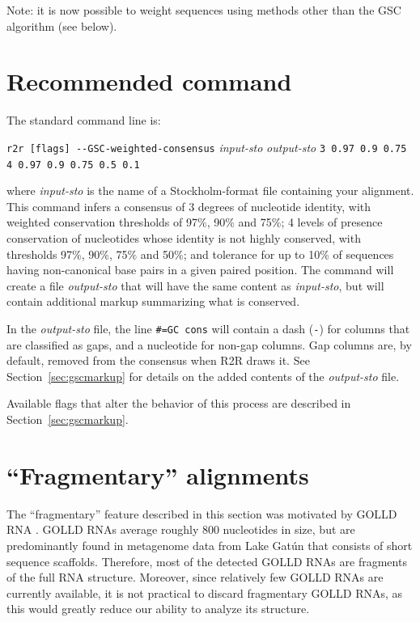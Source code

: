 \documentclass[letterpaper,12pt]{report}
\begin{document}
Note: it is now possible to weight sequences using methods other than the GSC algorithm (see below).

\section{Recommended command}
\label{sec:gscdefault}

The standard command line is:

{\tt r2r [flags] -{}-GSC-weighted-consensus} {\it input-sto} {\it output-sto} {\tt 3 0.97 0.9 0.75 4 0.97 0.9 0.75 0.5 0.1}

where {\it input-sto} is the name of a Stockholm-format file containing your alignment.
This command infers a consensus of 3 degrees of nucleotide identity, with weighted conservation thresholds
of 97\%, 90\% and 75\%; 4 levels of presence conservation of nucleotides whose identity is not highly conserved,
with thresholds 97\%, 90\%, 75\% and 50\%; and tolerance for up to 10\% of sequences having
non-canonical base pairs in a given paired position.
The command will create a file {\it output-sto} that will have the same content as {\it input-sto}, but will contain additional
markup summarizing what is conserved.

In the {\it output-sto} file, the line {\tt \#=GC cons} will contain a dash ({\tt -}) for columns that are classified as gaps, and a nucleotide for non-gap columns.
Gap columns are, by default, removed from the consensus when R2R draws it.  See Section~\ref{sec:gscmarkup} for details on the added contents of the {\it output-sto} file.

Available flags that alter the behavior of this process are described in Section~\ref{sec:gscmarkup}.

\section{``Fragmentary'' alignments}

The ``fragmentary'' feature described in this section was motivated by GOLLD RNA \cite{CoolRNAs}.
GOLLD RNAs average roughly 800 nucleotides in size, but are predominantly found in metagenome data
from Lake Gat{\'u}n that consists of short sequence scaffolds.
Therefore, most of the detected GOLLD RNAs are fragments of the full RNA structure.
Moreover, since relatively few GOLLD RNAs are currently available, it is not practical to discard fragmentary
GOLLD RNAs, as this would greatly reduce our ability to analyze its structure.
\end{document}
